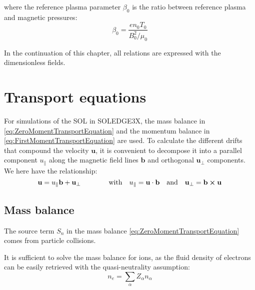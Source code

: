 where the reference plasma parameter $\beta_0$ is the ratio between reference plasma and magnetic pressures: 
\begin{equation}
	\beta_0 = \frac{en_0T_0}{B_0^2 / \mu_0}
\end{equation}

In the continuation of this chapter, all relations are expressed with the dimensionless fields.

\section{Transport equations}
\label{sec:S3X_TransportEquations}
For simulations of the SOL in SOLEDGE3X, the mass balance in \ref{eq:ZeroMomentTransportEquation} and the momentum balance in \ref{eq:FirstMomentTransportEquation} are used. To calculate the different drifts that compound the velocity $\mathbf{u}$, it is convenient to decompose it into a parallel component $u_\parallel$ along the magnetic field lines $\mathbf{b}$ and orthogonal $\mathbf{u}_\perp$ components. We here have the relationship:
\begin{equation}
	\label{eq:RelationPerpParallelVelocity}
	\mathbf{u} = u_\parallel \mathbf{b} + \mathbf{u}_\perp \qquad\qquad \text{with} \quad u_\parallel = \mathbf{u}\cdot\mathbf{b} \quad \text{and} \quad \mathbf{u}_\perp = \mathbf{b}\cross\mathbf{u}
\end{equation}

\subsection{Mass balance}
The source term $S_n$ in the mass balance \ref{eq:ZeroMomentTransportEquation} comes from particle collisions. 


It is sufficient to solve the mass balance for ions, as the fluid density of electrons can be easily retrieved with the quasi-neutrality assumption:
\begin{equation}
	n_e = \sum_{\alpha}Z_\alpha n_\alpha
\end{equation}

